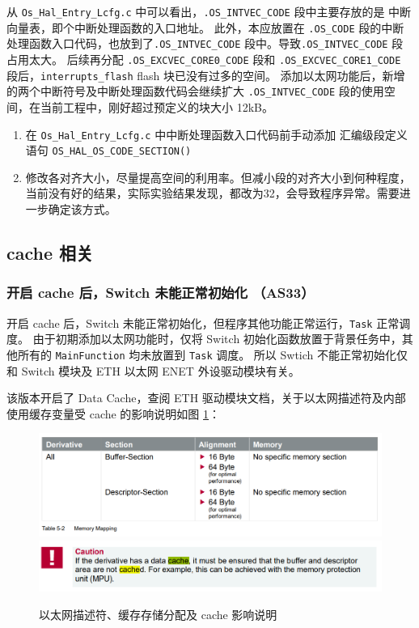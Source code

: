 从 \lstinline{Os_Hal_Entry_Lcfg.c} 中可以看出，\lstinline{.OS_INTVEC_CODE} 段中主要存放的是 中断向量表，即个中断处理函数的入口地址。
此外，本应放置在 \lstinline{.OS_CODE} 段的中断处理函数入口代码，也放到了\lstinline{.OS_INTVEC_CODE} 段中。导致\lstinline{.OS_INTVEC_CODE} 段占用太大。
后续再分配 \lstinline{.OS_EXCVEC_CORE0_CODE} 段和 \lstinline{.OS_EXCVEC_CORE1_CODE} 段后，\lstinline{interrupts_flash} flash 块已没有过多的空间。
添加以太网功能后，新增的两个中断符号及中断处理函数代码会继续扩大 \lstinline{.OS_INTVEC_CODE} 段的使用空间，在当前工程中，刚好超过预定义的块大小 12kB。

\begin{definition}[解决方案]
    \begin{enumerate}
        \item 在 \lstinline{Os_Hal_Entry_Lcfg.c} 中中断处理函数入口代码前手动添加 汇编级段定义语句 \lstinline{OS_HAL_OS_CODE_SECTION()}
        \item 修改各对齐大小，尽量提高空间的利用率。但减小段的对齐大小到何种程度，当前没有好的结果，实际实验结果发现，都改为32，会导致程序异常。需要进一步确定该方式。
    \end{enumerate}
\end{definition}

\subsection{cache 相关}
\subsubsection{开启 cache 后，Switch 未能正常初始化 （AS33）}\label{subsubsec:desc_buffer_cache}

开启  cache 后，Switch 未能正常初始化，但程序其他功能正常运行，\lstinline{Task} 正常调度。
由于初期添加以太网功能时，仅将 Switch 初始化函数放置于背景任务中，其他所有的 \lstinline{MainFunction} 均未放置到 \lstinline{Task} 调度。
所以 Swtich 不能正常初始化仅和 Switch 模块及 ETH 以太网 ENET 外设驱动模块有关。

该版本开启了 Data Cache，查阅 ETH 驱动模块文档，关于以太网描述符及内部使用缓存变量受 cache 的影响说明如图 \ref{fig:desc_buffer_cache}：

\begin{figure}[htbp]
    \centering
    \includegraphics[scale=0.8]{pic/Snipaste_2021-11-05_13-10-08.png}
    \includegraphics[scale=0.8]{pic/Snipaste_2021-11-05_13-10-26.png}
    \caption{以太网描述符、缓存存储分配及 cache 影响说明}
    \label{fig:desc_buffer_cache}
\end{figure}

